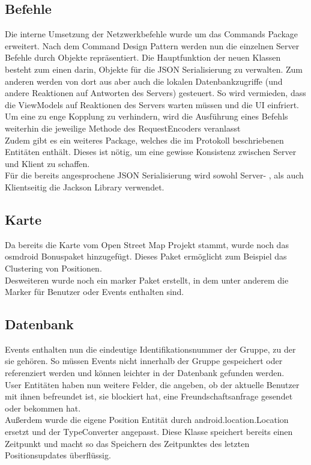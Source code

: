 \documentclass[parskip=full,11pt]{scrartcl}
\begin{document}
\subsection{Befehle}
Die interne Umsetzung der Netzwerkbefehle wurde um das Commands Package
erweitert. Nach dem Command Design Pattern werden nun die einzelnen Server
Befehle durch Objekte repräsentiert. Die Hauptfunktion der neuen Klassen
besteht zum einen darin, Objekte für die JSON Serialisierung zu verwalten. Zum
anderen werden von dort aus aber auch die lokalen Datenbankzugriffe (und
andere Reaktionen auf Antworten des Servers) gesteuert. So wird vermieden, dass
die ViewModels auf Reaktionen des Servers warten müssen und die UI einfriert.
Um eine zu enge Kopplung zu verhindern, wird die Ausführung eines Befehls
weiterhin die jeweilige Methode des RequestEncoders veranlasst\\
Zudem gibt es ein weiteres Package, welches die im Protokoll beschriebenen
Entitäten enthält. Dieses ist nötig, um eine gewisse Konsistenz zwischen Server
und Klient zu schaffen.\\
Für die bereits angesprochene JSON Serialisierung wird sowohl Server- , als
auch Klientseitig die Jackson Library verwendet.

\subsection{Karte}
Da bereits die Karte vom Open Street Map Projekt stammt, wurde noch das 
osmdroid Bonuspaket hinzugefügt. Dieses Paket ermöglicht zum Beispiel 
das Clustering von Positionen.\\
Desweiteren wurde noch ein marker Paket erstellt, in dem unter anderem die 
Marker für Benutzer oder Events enthalten sind.

\subsection{Datenbank}
Events enthalten nun die eindeutige Identifikationsnummer der Gruppe,
zu der sie gehören. So müssen Events nicht innerhalb der Gruppe
gespeichert oder referenziert werden und können leichter in der
Datenbank gefunden werden.\\
User Entitäten haben nun weitere Felder, die angeben, ob der aktuelle Benutzer
mit ihnen befreundet ist, sie blockiert hat, eine Freundschaftsanfrage
gesendet oder bekommen hat.\\
Außerdem wurde die eigene Position Entität durch android.location.Location
ersetzt und der TypeConverter angepasst. Diese Klasse speichert bereits
einen Zeitpunkt und macht so das Speichern des Zeitpunktes des letzten
Positionsupdates überflüssig.
\end{document}

